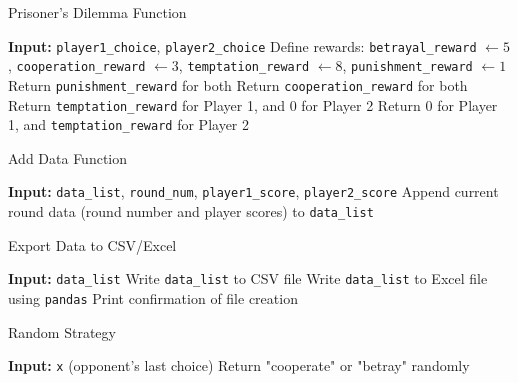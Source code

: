 \documentclass{article}
\begin{document}
\begin{algorithm}[H]
\caption{Prisoner's Dilemma Function}
\begin{algorithmic}[1]
\STATE \textbf{Input:} \texttt{player1\_choice}, \texttt{player2\_choice}
\STATE Define rewards: \texttt{betrayal\_reward} $\gets 5$, \texttt{cooperation\_reward} $\gets 3$, \texttt{temptation\_reward} $\gets 8$, \texttt{punishment\_reward} $\gets 1$
    \STATE Return \texttt{punishment\_reward} for both
    \STATE Return \texttt{cooperation\_reward} for both
    \STATE Return \texttt{temptation\_reward} for Player 1, and 0 for Player 2
    \STATE Return 0 for Player 1, and \texttt{temptation\_reward} for Player 2
\ENDIF
\end{algorithmic}
\end{algorithm}

\begin{algorithm}[H]
\caption{Add Data Function}
\begin{algorithmic}[1]
\STATE \textbf{Input:} \texttt{data\_list}, \texttt{round\_num}, \texttt{player1\_score}, \texttt{player2\_score}
\STATE Append current round data (round number and player scores) to \texttt{data\_list}
\end{algorithmic}
\end{algorithm}

\begin{algorithm}[H]
\caption{Export Data to CSV/Excel}
\begin{algorithmic}[1]
\STATE \textbf{Input:} \texttt{data\_list}
\STATE Write \texttt{data\_list} to CSV file
\STATE Write \texttt{data\_list} to Excel file using \texttt{pandas}
\STATE Print confirmation of file creation
\end{algorithmic}
\end{algorithm}

\begin{algorithm}[H]
\caption{Random Strategy}
\begin{algorithmic}[1]
\STATE \textbf{Input:} \texttt{x} (opponent's last choice)
\STATE Return "cooperate" or "betray" randomly
\end{algorithmic}
\end{algorithm}
\end{document}
